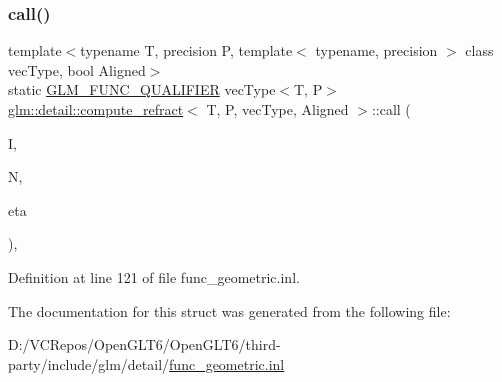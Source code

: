 \subsubsection{\texorpdfstring{call()}{call()}}
{\footnotesize\ttfamily template$<$typename T, precision P, template$<$ typename, precision $>$ class vec\+Type, bool Aligned$>$ \\
static \mbox{\hyperlink{setup_8hpp_a33fdea6f91c5f834105f7415e2a64407}{G\+L\+M\+\_\+\+F\+U\+N\+C\+\_\+\+Q\+U\+A\+L\+I\+F\+I\+ER}} vec\+Type$<$T, P$>$ \mbox{\hyperlink{structglm_1_1detail_1_1compute__refract}{glm\+::detail\+::compute\+\_\+refract}}$<$ T, P, vec\+Type, Aligned $>$\+::call (\begin{DoxyParamCaption}\item[{vec\+Type$<$ T, P $>$ const \&}]{I,  }\item[{vec\+Type$<$ T, P $>$ const \&}]{N,  }\item[{T}]{eta }\end{DoxyParamCaption})\hspace{0.3cm}{\ttfamily [inline]}, {\ttfamily [static]}}



Definition at line 121 of file func\+\_\+geometric.\+inl.



The documentation for this struct was generated from the following file\+:\begin{DoxyCompactItemize}
\item 
D\+:/\+V\+C\+Repos/\+Open\+G\+L\+T6/\+Open\+G\+L\+T6/third-\/party/include/glm/detail/\mbox{\hyperlink{func__geometric_8inl}{func\+\_\+geometric.\+inl}}\end{DoxyCompactItemize}
